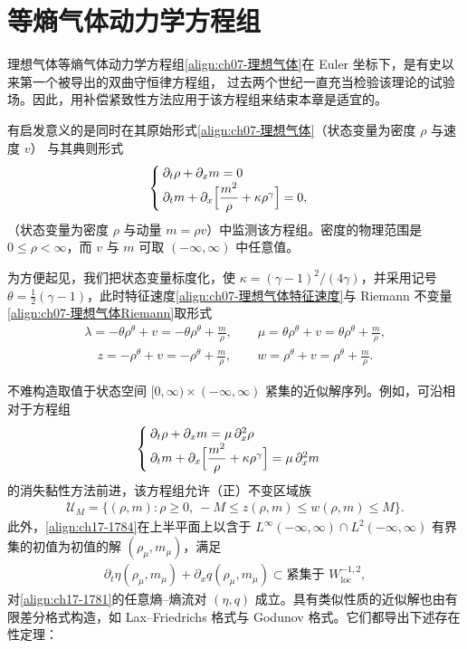 \documentclass[../../main.tex]{subfiles}
\begin{document}
\section{等熵气体动力学方程组}\label{section:ch17-等熵气体动力学}

理想气体等熵气体动力学方程组\eqref{align:ch07-理想气体}在 Euler 坐标下，是有史以来第一个被导出的双曲守恒律方程组，
过去两个世纪一直充当检验该理论的试验场。因此，用补偿紧致性方法应用于该方程组来结束本章是适宜的。

有启发意义的是同时在其原始形式\eqref{align:ch07-理想气体}（状态变量为密度 $\rho$ 与速度 $v$）
与其典则形式
\begin{align}
\begin{cases}
\partial_t\rho+\partial_x m=0\\
\partial_t m+\partial_x\Bigl[\dfrac{m^2}{\rho}+\kappa\rho^\gamma\Bigr]=0,
\end{cases}
\label{align:ch17-1781}
\end{align}
（状态变量为密度 $\rho$ 与动量 $m=\rho v$）中监测该方程组。密度的物理范围是 $0\leqslant\rho<\infty$，而 $v$ 与 $m$ 可取 $(-\infty,\infty)$ 中任意值。

为方便起见，我们把状态变量标度化，使 $\kappa=(\gamma-1)^2/(4\gamma)$，并采用记号 $\theta=\frac{1}{2}(\gamma-1)$，此时特征速度\eqref{align:ch07-理想气体特征速度}与 Riemann 不变量\eqref{align:ch07-理想气体Riemann}取形式
\begin{align}
\lambda=-\theta\rho^\theta+v=-\theta\rho^\theta+\frac{m}{\rho},\qquad\mu=\theta\rho^\theta+v=\theta\rho^\theta+\frac{m}{\rho},
\label{align:ch17-1782}
\end{align}
\begin{align}
z=-\rho^\theta+v=-\rho^\theta+\frac{m}{\rho},\qquad w=\rho^\theta+v=\rho^\theta+\frac{m}{\rho}.
\label{align:ch17-1783}
\end{align}

不难构造取值于状态空间 $[0,\infty)\times(-\infty,\infty)$ 紧集的近似解序列。例如，可沿相对于方程组
\begin{align}
\begin{cases}
\partial_t\rho+\partial_x m=\mu\,\partial_x^2\rho\\
\partial_t m+\partial_x\Bigl[\dfrac{m^2}{\rho}+\kappa\rho^\gamma\Bigr]=\mu\,\partial_x^2m
\end{cases}
\label{align:ch17-1784}
\end{align}
的消失黏性方法前进，该方程组允许（正）不变区域族
\begin{align}
\mathscr{U}_M=\{(\rho,m):\rho\geqslant0,\ -M\leqslant z(\rho,m)\leqslant w(\rho,m)\leqslant M\}.
\label{align:ch17-1785}
\end{align}
此外，\eqref{align:ch17-1784}在上半平面上以含于 $L^\infty(-\infty,\infty)\cap L^2(-\infty,\infty)$ 有界集的初值为初值的解 $(\rho_\mu,m_\mu)$，满足
\begin{align}
\partial_t\eta(\rho_\mu,m_\mu)+\partial_x q(\rho_\mu,m_\mu)\subset\text{紧集于 }W^{-1,2}_{\mathrm{loc}},
\label{align:ch17-1786}
\end{align}
对\eqref{align:ch17-1781}的任意熵--熵流对 $(\eta,q)$ 成立。具有类似性质的近似解也由有限差分格式构造，如 Lax--Friedrichs 格式与 Godunov 格式。它们都导出下述存在性定理：
\end{document}
